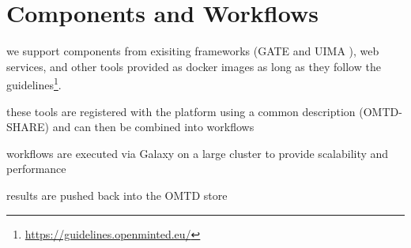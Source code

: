 \section{Components and Workflows}

we support components from exisiting frameworks (GATE \cite{Cun13a} and UIMA \cite{OASIS:UIMA:2009}), web services, and other tools provided as docker images as long as they follow the guidelines\footnote{\url{https://guidelines.openminted.eu/}}.

these tools are registered with the platform using a common description (OMTD-SHARE) and can then be combined into workflows

workflows are executed via Galaxy on a large cluster to provide scalability and performance

results are pushed back into the OMTD store
